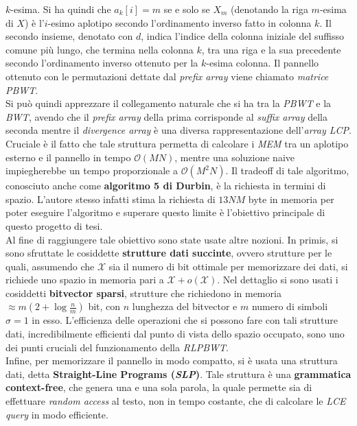 \documentclass[a4paper,11pt, oneside]{article}
\begin{document}
$k$-esima. Si ha quindi che $a_k[i]=m$ se e solo se $X_m$ 
(denotando la riga $m$-esima di $X$) è l'$i$-esimo aplotipo secondo
l'ordinamento inverso fatto in colonna $k$. Il secondo insieme, denotato con
$d$, indica l'indice della colonna iniziale del suffisso comune più lungo, che
termina nella colonna $k$, tra una riga e la sua precedente secondo
l'ordinamento inverso ottenuto per la $k$-esima colonna. Il pannello ottenuto
con le permutazioni dettate dal \textit{prefix array} viene chiamato
\textit{matrice PBWT}.\\
Si può quindi apprezzare il collegamento naturale che si ha tra la \textit{PBWT}
e la \textit{BWT}, avendo che il \textit{prefix array} della prima corrisponde
al \textit{suffix array} della seconda mentre il \textit{divergence array} è una
  diversa rappresentazione dell'\textit{array LCP}. \\ 
Cruciale è il fatto che tale struttura permetta di calcolare i \textit{MEM} tra
un aplotipo esterno e il pannello in tempo $\mathcal{O}(MN)$, mentre 
una 
soluzione naive impiegherebbe un tempo proporzionale a $\mathcal{O}(M^2N)$. Il
tradeoff di tale algoritmo, conosciuto anche come \textbf{algoritmo 5 di
  Durbin}, è la richiesta in termini di spazio. L'autore stesso infatti stima la
richiesta di $13NM$ byte in memoria per poter eseguire l'algoritmo e superare
questo limite è l'obiettivo principale di questo progetto di tesi.\\
Al fine di raggiungere tale obiettivo sono state usate altre nozioni. In primis,
si sono sfruttate le cosiddette \textbf{strutture dati succinte}, ovvero
strutture per le quali, assumendo che $\mathcal{X}$ sia il numero di bit
ottimale per memorizzare dei dati, si richiede uno spazio in memoria pari a
$\mathcal{X}+o(\mathcal{X})$. Nel dettaglio si sono usati i cosiddetti
\textbf{bitvector sparsi}, strutture che richiedono in memoria $\approx
m\left(2+\log\frac{n}{m}\right)$ bit, con $n$ lunghezza del bitvector e $m$
numero di simboli $\sigma=1$ in esso. L'efficienza delle operazioni che si
possono fare con tali strutture dati, incredibilmente efficienti dal punto di
vista dello spazio occupato, sono uno dei punti cruciali del funzionamento della
\textit{RLPBWT}.\\
Infine, per memorizzare il pannello in modo compatto, si è usata una
struttura dati, detta \textbf{Straight-Line Programs (\textit{SLP})}. Tale
struttura è una \textbf{grammatica context-free}, che
genera una e una sola parola, la quale permette sia di effettuare \textit{random
access} al testo, non in tempo costante, che di calcolare le \textit{LCE
query} in modo efficiente. 
\end{document}
